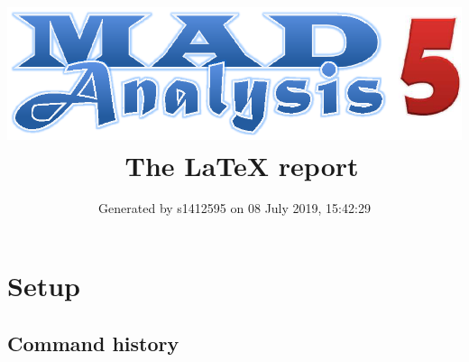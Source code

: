 \documentclass[a4paper, 10pt]{article}
\title{{\includegraphics[scale=.4]{logo.eps}}\ The LaTeX report}
\author{Generated by s1412595 on 08 July 2019, 15:42:29}
\begin{document}
\maketitle
\flushbottom

\newpage
\section{ Setup}

\subsection{ Command history}
\end{document}
